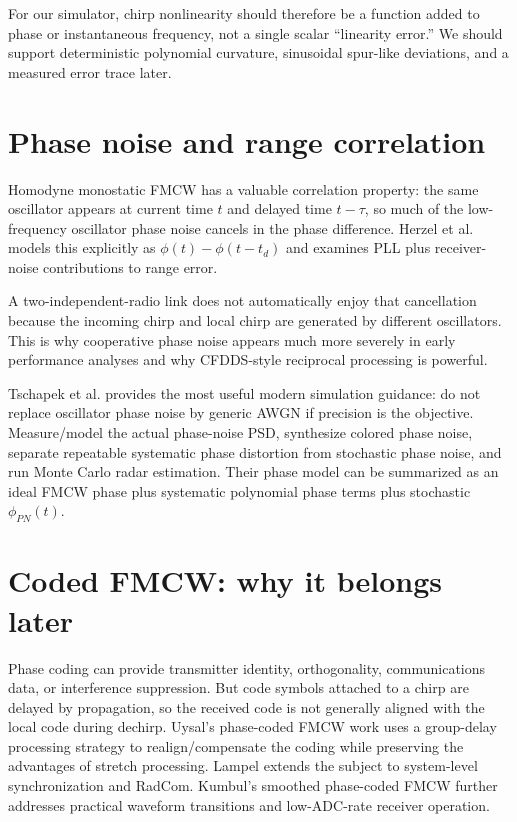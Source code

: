 \documentclass[11pt]{article}
\begin{document}
For our simulator, chirp nonlinearity should therefore be a function added to phase or instantaneous frequency, not a single scalar ``linearity error.'' We should support deterministic polynomial curvature, sinusoidal spur-like deviations, and a measured error trace later.

\section{Phase noise and range correlation}
Homodyne monostatic FMCW has a valuable correlation property: the same oscillator appears at current time $t$ and delayed time $t-\tau$, so much of the low-frequency oscillator phase noise cancels in the phase difference. Herzel et al. models this explicitly as $\phi(t)-\phi(t-t_d)$ and examines PLL plus receiver-noise contributions to range error.

A two-independent-radio link does not automatically enjoy that cancellation because the incoming chirp and local chirp are generated by different oscillators. This is why cooperative phase noise appears much more severely in early performance analyses and why CFDDS-style reciprocal processing is powerful.

Tschapek et al. provides the most useful modern simulation guidance: do not replace oscillator phase noise by generic AWGN if precision is the objective. Measure/model the actual phase-noise PSD, synthesize colored phase noise, separate repeatable systematic phase distortion from stochastic phase noise, and run Monte Carlo radar estimation. Their phase model can be summarized as an ideal FMCW phase plus systematic polynomial phase terms plus stochastic $\phi_{PN}(t)$.

\section{Coded FMCW: why it belongs later}
Phase coding can provide transmitter identity, orthogonality, communications data, or interference suppression. But code symbols attached to a chirp are delayed by propagation, so the received code is not generally aligned with the local code during dechirp. Uysal's phase-coded FMCW work uses a group-delay processing strategy to realign/compensate the coding while preserving the advantages of stretch processing. Lampel extends the subject to system-level synchronization and RadCom. Kumbul's smoothed phase-coded FMCW further addresses practical waveform transitions and low-ADC-rate receiver operation.
\end{document}
